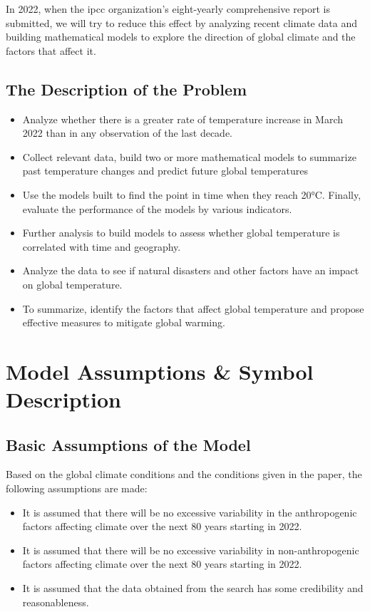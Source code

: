 \documentclass{apmcmthesis}
\begin{document}
In 2022, when the ipcc organization's eight-yearly comprehensive report is submitted, we will try to reduce this effect by analyzing recent climate data and building mathematical models to explore the direction of global climate and the factors that affect it.


\subsection{The Description of the Problem}

\begin{itemize}
\item Analyze whether there is a greater rate of temperature increase in March 2022 than in any observation of the last decade.
\item Collect relevant data, build two or more mathematical models to summarize past temperature changes and predict future global temperatures
\item Use the models built to find the point in time when they reach 20°C. Finally, evaluate the performance of the models by various indicators.
\item Further analysis to build models to assess whether global temperature is correlated with time and geography.
\item Analyze the data to see if natural disasters and other factors have an impact on global temperature.
\item To summarize, identify the factors that affect global temperature and propose effective measures to mitigate global warming.

\end{itemize}





\section{Model Assumptions \& Symbol Description} 
\subsection{Basic Assumptions of the Model}
Based on the global climate conditions and the conditions given in the paper, the following assumptions are made:
\begin{itemize}
    \item It is assumed that there will be no excessive variability in the anthropogenic factors affecting climate over the next 80 years starting in 2022.
    \item It is assumed that there will be no excessive variability in non-anthropogenic factors affecting climate over the next 80 years starting in 2022.
    \item It is assumed that the data obtained from the search has some credibility and reasonableness.
\end{itemize}
\end{document}

